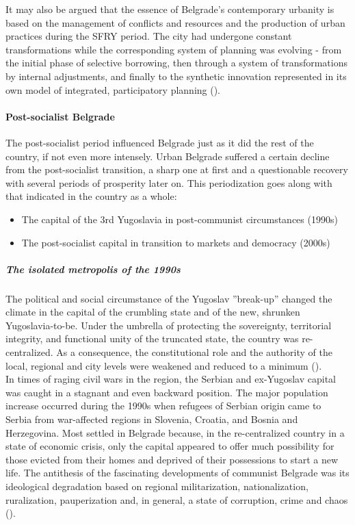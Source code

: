 \documentclass[11pt]{report}
\begin{document}
It may also be argued that the essence of Belgrade’s contemporary urbanity is based on the management of conflicts and resources and the production of urban practices during the SFRY period. The city had undergone constant transformations while the corresponding system of planning was evolving - from the initial phase of selective borrowing, then through a system of transformations by internal adjustments, and finally to the synthetic innovation represented in its own model of integrated, participatory planning (\href{Nedovic}{\citealt{nedovicbudic_waves_2006}}).

\paragraph{Post-socialist Belgrade}

The post-socialist period influenced Belgrade just as it did the rest of the country, if not even more intensely. Urban Belgrade suffered a certain decline from the post-socialist transition, a sharp one at first and a questionable recovery with several periods of prosperity later on. This periodization goes along with that indicated in the country as a whole:

\begin{itemize}
\item The capital of the 3rd Yugoslavia in post-communist circumstances (1990s)
\item The post-socialist capital in transition to markets and democracy (2000s)
\end{itemize}

\subparagraph{The isolated metropolis of the 1990s}

The political and social circumstance of the Yugoslav ”break-up” changed the climate in the capital of the crumbling state and of the new, shrunken Yugoslavia-to-be. Under the umbrella of protecting the sovereignty, territorial integrity, and functional unity of the truncated state, the country was re-centralized. As a consequence, the constitutional role and the authority of the local, regional and city levels were weakened and reduced to a minimum (\href{Vujosevic}{\citealt{vujosevic_regionalizam_2015}}). 
\\

In times of raging civil wars in the region, the Serbian and ex-Yugoslav capital was caught in a stagnant and even backward position. The major population increase occurred during the 1990s when refugees of Serbian origin came to Serbia from war-affected regions in Slovenia, Croatia, and Bosnia and Herzegovina. Most settled in Belgrade because, in the re-centralized country in a state of economic crisis, only the capital appeared to offer much possibility for those evicted from their homes and deprived of their possessions to start a new life.
The antithesis of the fascinating developments of communist Belgrade was its ideological degradation based on regional militarization, nationalization, ruralization, pauperization and, in general, a state of corruption, crime and chaos (\href{Samardzic}{\citealt{doytchinov_belgrade_2015}}). 
\\
\end{document}
